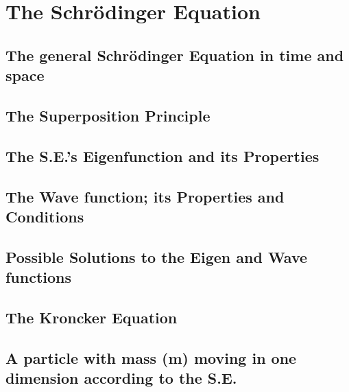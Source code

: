 \documentclass[../../Quantum-Technologies-Notes]{subfiles}
\begin{document}
	
	\ifSubfilesClassLoaded{ \pagestyle{fancy} }
	
	
	\section{The Schrödinger Equation}
		
		\subsection{The general Schrödinger Equation in time and space}
		
		
		\subsection{The Superposition Principle}
		
		
		\subsection{The S.E.’s Eigenfunction and its Properties}
		
			
		
		\subsection{The Wave function; its Properties and Conditions}
		
		
		\subsection{Possible Solutions to the Eigen and Wave functions}
		
		
		\subsection{The Kroncker Equation}
		
			
		
		\subsection{A particle with mass (m) moving in one dimension according to the S.E.}
			
			
			
\end{document}

